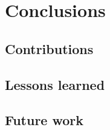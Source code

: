 \documentclass[../thesis.tex]{subfiles}
\begin{document}
    \chapter{Conclusions}

    \section{Contributions}

    \section{Lessons learned}

    \section{Future work}
\end{document}
